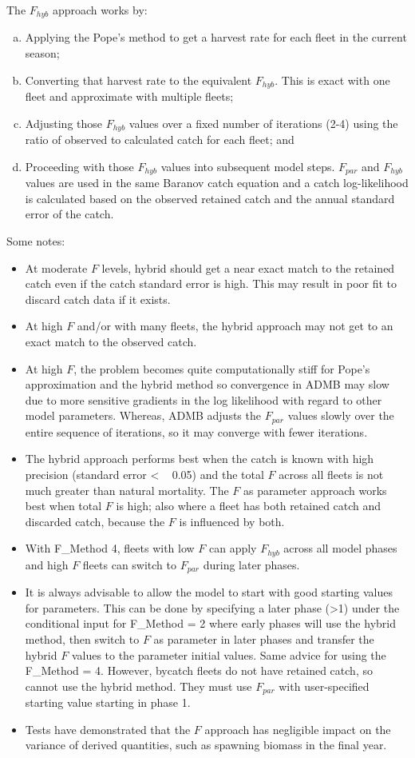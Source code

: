 The $F_{hyb}$ approach works by:
\begin{enumerate}[a.]
	\item Applying the Pope’s method to get a harvest rate for each fleet in the current season;
	\item Converting that harvest rate to the equivalent $F_{hyb}$. This is exact with one fleet and approximate with multiple fleets;
	\item Adjusting those $F_{hyb}$ values over a fixed number of iterations (2-4) using the ratio of observed to calculated catch for each fleet; and
	\item Proceeding with those $F_{hyb}$ values into subsequent model steps. $F_{par}$ and $F_{hyb}$ values are used in the same Baranov catch equation and a catch log-likelihood is calculated based on the observed retained catch and the annual standard error of the catch.
\end{enumerate}

Some notes:
\begin{itemize}
	\item At moderate $F$ levels, hybrid should get a near exact match to the retained catch even if the catch standard error is high. This may result in poor fit to discard catch data if it exists.
	\item At high $F$ and/or with many fleets, the hybrid approach may not get to an exact match to the observed catch.
	\item At high $F$, the problem becomes quite computationally stiff for Pope’s approximation and the hybrid method so convergence in ADMB may slow due to more sensitive gradients in the log likelihood with regard to other model parameters. Whereas, ADMB adjusts the $F_{par}$ values slowly over the entire sequence of iterations, so it may converge with fewer iterations.
	\item The hybrid approach performs best when the catch is known with high precision (standard error < ~ 0.05) and the total $F$ across all fleets is not much greater than natural mortality. The $F$ as parameter approach works best when total $F$ is high; also where a fleet has both retained catch and discarded catch, because the $F$ is influenced by both. 
	\item With F\_Method 4, fleets with low $F$ can apply $F_{hyb}$ across all model phases and high $F$ fleets can switch to $F_{par}$ during later phases.
	\item It is always advisable to allow the model to start with good starting values for parameters. This can be done by specifying a later phase (>1) under the conditional input for F\_Method = 2 where early phases will use the hybrid method, then switch to $F$ as parameter in later phases and transfer the hybrid $F$ values to the parameter initial values. Same advice for using the F\_Method = 4. However, bycatch fleets do not have retained catch, so cannot use the hybrid method. They must use $F_{par}$ with user-specified starting value starting in phase 1.
	\item Tests have demonstrated that the $F$ approach has negligible impact on the variance of derived quantities, such as spawning biomass in the final year.
\end{itemize}

